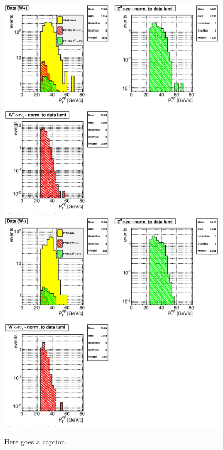 \documentclass[12pt]{article}
\begin{document}
\begin{figure}[htbp]
\begin{center}
\includegraphics[scale=0.6]{images/backgrounds/plot_4}\\
\includegraphics[scale=0.6]{images/backgrounds/plot_6}
\end{center}
\caption{Here goes a caption.}
\label{fig:plot_WZ_backgorunds} 
\end{figure}
\end{document}
